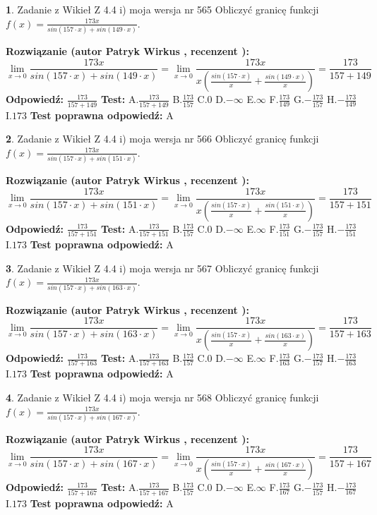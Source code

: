 \documentclass[12pt, a4paper]{article}
\theoremstyle{definition} %
\newtheorem{zad}{}
\newcommand{\zadStart}[1]{\begin{zad}#1\newline}
\newcommand{\zadStop}{\end{zad}}
\newcommand{\rozwStart}[2]{\noindent \textbf{Rozwiązanie (autor #1 , recenzent #2): }\newline}
\newcommand{\rozwStop}{\newline}
\newcommand{\odpStart}{\noindent \textbf{Odpowiedź:}\newline}
\newcommand{\odpStop}{\newline}
\newcommand{\testStart}{\noindent \textbf{Test:}\newline}
\newcommand{\testStop}{\newline}
\newcommand{\kluczStart}{\noindent \textbf{Test poprawna odpowiedź:}\newline}
\newcommand{\kluczStop}{\newline}
\begin{document}
\zadStart{Zadanie z Wikieł Z 4.4 i) moja wersja nr 565}
Obliczyć granicę funkcji $f(x)=\frac{173x}{sin(157\cdot x) +sin(149\cdot x)}$.
\zadStop
\rozwStart{Patryk Wirkus}{}
$$\lim\limits_{x\to 0}\frac{173x}{sin(157\cdot x) +sin(149\cdot x)}=\lim\limits_{x\to 0}\frac{173x}{x(\frac{sin(157\cdot x)}{x}+\frac{sin(149\cdot x)}{x})}=\frac{173}{157+149}$$
\rozwStop
\odpStart
$\frac{173}{157+149}$
\odpStop
\testStart
A.$\frac{173}{157+149}$
B.$\frac{173}{157}$
C.$0$
D.$-\infty$
E.$\infty$
F.$\frac{173}{149}$
G.$-\frac{173}{157}$
H.$-\frac{173}{149}$
I.$173$
\testStop
\kluczStart
A
\kluczStop



\zadStart{Zadanie z Wikieł Z 4.4 i) moja wersja nr 566}
Obliczyć granicę funkcji $f(x)=\frac{173x}{sin(157\cdot x) +sin(151\cdot x)}$.
\zadStop
\rozwStart{Patryk Wirkus}{}
$$\lim\limits_{x\to 0}\frac{173x}{sin(157\cdot x) +sin(151\cdot x)}=\lim\limits_{x\to 0}\frac{173x}{x(\frac{sin(157\cdot x)}{x}+\frac{sin(151\cdot x)}{x})}=\frac{173}{157+151}$$
\rozwStop
\odpStart
$\frac{173}{157+151}$
\odpStop
\testStart
A.$\frac{173}{157+151}$
B.$\frac{173}{157}$
C.$0$
D.$-\infty$
E.$\infty$
F.$\frac{173}{151}$
G.$-\frac{173}{157}$
H.$-\frac{173}{151}$
I.$173$
\testStop
\kluczStart
A
\kluczStop



\zadStart{Zadanie z Wikieł Z 4.4 i) moja wersja nr 567}
Obliczyć granicę funkcji $f(x)=\frac{173x}{sin(157\cdot x) +sin(163\cdot x)}$.
\zadStop
\rozwStart{Patryk Wirkus}{}
$$\lim\limits_{x\to 0}\frac{173x}{sin(157\cdot x) +sin(163\cdot x)}=\lim\limits_{x\to 0}\frac{173x}{x(\frac{sin(157\cdot x)}{x}+\frac{sin(163\cdot x)}{x})}=\frac{173}{157+163}$$
\rozwStop
\odpStart
$\frac{173}{157+163}$
\odpStop
\testStart
A.$\frac{173}{157+163}$
B.$\frac{173}{157}$
C.$0$
D.$-\infty$
E.$\infty$
F.$\frac{173}{163}$
G.$-\frac{173}{157}$
H.$-\frac{173}{163}$
I.$173$
\testStop
\kluczStart
A
\kluczStop



\zadStart{Zadanie z Wikieł Z 4.4 i) moja wersja nr 568}
Obliczyć granicę funkcji $f(x)=\frac{173x}{sin(157\cdot x) +sin(167\cdot x)}$.
\zadStop
\rozwStart{Patryk Wirkus}{}
$$\lim\limits_{x\to 0}\frac{173x}{sin(157\cdot x) +sin(167\cdot x)}=\lim\limits_{x\to 0}\frac{173x}{x(\frac{sin(157\cdot x)}{x}+\frac{sin(167\cdot x)}{x})}=\frac{173}{157+167}$$
\rozwStop
\odpStart
$\frac{173}{157+167}$
\odpStop
\testStart
A.$\frac{173}{157+167}$
B.$\frac{173}{157}$
C.$0$
D.$-\infty$
E.$\infty$
F.$\frac{173}{167}$
G.$-\frac{173}{157}$
H.$-\frac{173}{167}$
I.$173$
\testStop
\kluczStart
A
\kluczStop
\end{document}
